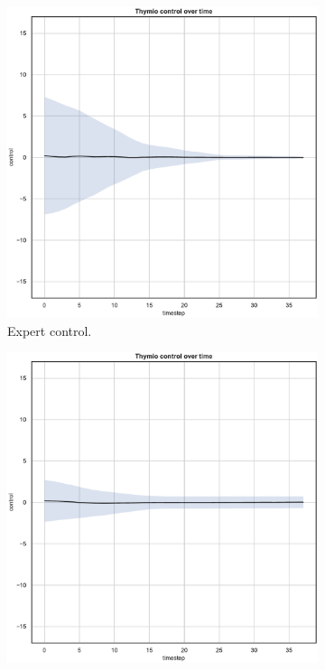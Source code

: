 \begin{figure}[!htb]
	\begin{center}
		\begin{subfigure}[h]{0.35\textwidth}
			\includegraphics[width=\textwidth]{contents/images/net-d6/control-overtime-omniscient}%
			\caption{Expert control.}
		\end{subfigure}
		\hspace{1cm}
		\begin{subfigure}[h]{0.35\textwidth}
			\includegraphics[width=\textwidth]{contents/images/net-d6/control-overtime-learned_distributed}

\end{subfigure}
\end{center}
\end{figure}

